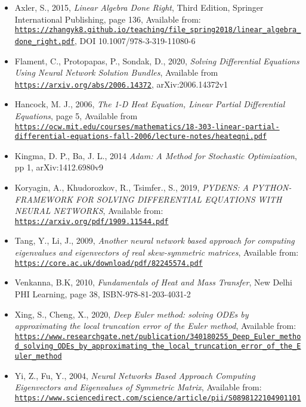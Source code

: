 \documentclass[12pt,a4paper]{article}
\begin{document}
\begin{itemize}
	\item Axler, S., 2015, \emph{Linear Algebra Done Right}, Third Edition, Springer International Publishing, page 136, Available from: \href{{https://zhangyk8.github.io/teaching/file_spring2018/linear_algebra_done_right.pdf}}{\nolinkurl{https://zhangyk8.github.io/teaching/file_spring2018/linear_algebra_done_right.pdf}}, DOI 10.1007/978-3-319-11080-6
	\item Flament, C., Protopapas, P., Sondak, D., 2020, \emph{Solving Differential Equations Using Neural Network Solution Bundles}, Available from \href{{https://arxiv.org/abs/2006.14372}}{\nolinkurl{https://arxiv.org/abs/2006.14372}}, arXiv:2006.14372v1
  \item Hancock, M. J., 2006, \emph{The 1-D Heat Equation, Linear Partial Differential Equations}, page 5, Available from \href{{https://ocw.mit.edu/courses/mathematics/18-303-linear-partial-differential-equations-fall-2006/lecture-notes/heateqni.pdf}}{\nolinkurl{https://ocw.mit.edu/courses/mathematics/18-303-linear-partial-differential-equations-fall-2006/lecture-notes/heateqni.pdf}}
  \item Kingma, D. P., Ba, J. L., 2014 \emph{Adam: A Method for Stochastic Optimization}, pp 1, arXiv:1412.6980v9
  \item Koryagin, A., Khudorozkov, R., Tsimfer., S., 2019, \emph{PYDENS: A PYTHON-FRAMEWORK FOR SOLVING DIFFERENTIAL EQUATIONS WITH NEURAL NETWORKS}, Available from: \href{{https://arxiv.org/pdf/1909.11544.pdf}}{\nolinkurl{https://arxiv.org/pdf/1909.11544.pdf}}
  \item Tang, Y., Li, J., 2009, \emph{Another neural network based approach for computing eigenvalues and eigenvectors of real skew-symmetric matrices}, Available from: \href{{https://core.ac.uk/download/pdf/82245574.pdf}}{\nolinkurl{https://core.ac.uk/download/pdf/82245574.pdf}}
  \item Venkanna, B.K, 2010, \emph{Fundamentals of Heat and Mass Transfer}, New Delhi PHI Learning, page 38, ISBN-978-81-203-4031-2
  \item Xing, S., Cheng, X., 2020, \emph{Deep Euler method: solving ODEs by approximating the local truncation error of the Euler method}, Available from: \href{{https://www.researchgate.net/publication/340180255_Deep_Euler_method_solving_ODEs_by_approximating_the_local_truncation_error_of_the_Euler_method}}{\nolinkurl{https://www.researchgate.net/publication/340180255_Deep_Euler_method_solving_ODEs_by_approximating_the_local_truncation_error_of_the_Euler_method}}
  \item Yi, Z., Fu, Y., 2004, \emph{Neural Networks Based Approach Computing Eigenvectors and Eigenvalues of Symmetric Matrix}, Available from: \href{{https://www.sciencedirect.com/science/article/pii/S0898122104901101}}{\nolinkurl{https://www.sciencedirect.com/science/article/pii/S0898122104901101}}
\end{itemize}
\end{document}
